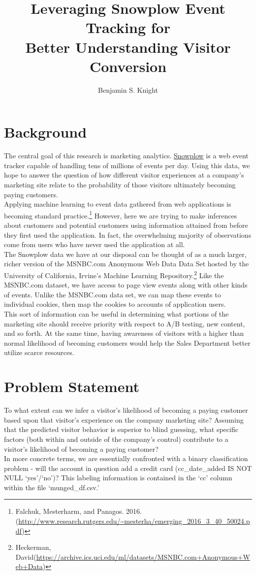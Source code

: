\documentclass{article} %
\author{Benjamin S. Knight}
\title{%
Leveraging Snowplow Event Tracking for \\ Better Understanding Visitor Conversion}
\begin{document}
\maketitle
\section{Background}
\indent\indent The central goal of this research is marketing analytics.
\href{http://snowplowanalytics.com/}{Snowplow} is a web event tracker capable of handling tens of millions of events per day. Using this data, we hope to answer the question of how different visitor experiences at a company's marketing site relate to the probability of those visitors ultimately becoming paying customers. \\
\indent Applying machine learning to event data gathered from web applications is becoming standard practice.\footnote{Falchuk, Mesterharm, and Panagos. 2016. (\url{http://www.research.rutgers.edu/~mesterha/emerging_2016_3_40_50024.pdf})} However, here we are trying to make inferences about customers and potential customers using information attained from before they first used the application. In fact, the overwhelming majority of observations come from users who have never used the application at all. \\
\indent The Snowplow data we have at our disposal can be thought of as a much larger, richer version of the MSNBC.com Anonymous Web Data Data Set hosted by the University of California, Irvine's Machine Learning Repository.\footnote{Heckerman, David(\url{https://archive.ics.uci.edu/ml/datasets/MSNBC.com+Anonymous+Web+Data})} Like the MSNBC.com dataset, we have access to page view events along with other kinds of events. Unlike the MSNBC.com data set, we can map these events to individual cookies, then map the cookies to accounts of application users. \\
\indent This sort of information can be useful in determining what portions of the marketing site should receive priority with respect to A/B testing, new content, and so forth. At the same time, having awareness of visitors with a higher than normal likelihood of becoming customers would help the Sales Department better utilize scarce resources.

\section{Problem Statement}
\indent\indent To what extent can we infer a visitor's likelihood of becoming a paying customer based upon that visitor's experience on the company marketing site? Assuming that the predicted visitor behavior is superior to blind guessing, what specific factors (both within and outside of the company's control) contribute to a visitor's likelihood of becoming a paying customer?\\
\indent In more concrete terms, we are essentially confronted with a binary classification problem - will the account in question add a credit card (cc\_date\_added IS NOT NULL `yes'/`no')? This labeling information is contained in the `cc' column within the file `munged\_df.csv.' 
\end{document}

